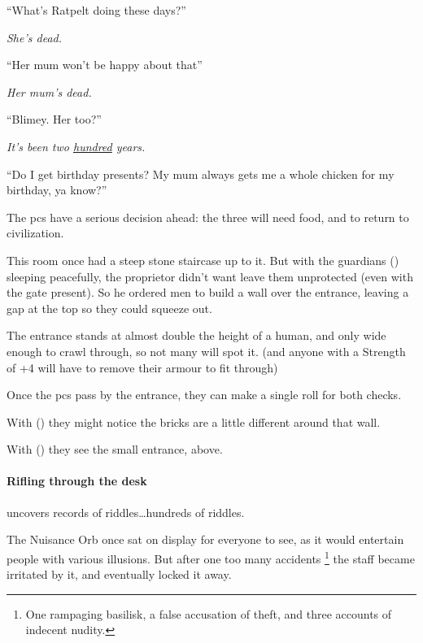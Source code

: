 \begin{speechtext}
  ``What's Ratpelt doing these days?''

  \textit{\raggedleft{} She's dead.}

  ``Her mum won't be happy about that''

  \textit{\raggedleft{} Her mum's dead.}

  ``Blimey. Her too?''

  \textit{\raggedleft{} It's been two \underline{hundred} years.}

  ``Do I get birthday presents?
  My mum always gets me a whole chicken for my birthday, ya know?''
\end{speechtext}

The \glspl{pc} have a serious decision ahead: the three will need food, and to return to civilization.


\begin{exampletext}
  This room once had a steep stone staircase up to it.
  But with the guardians () sleeping peacefully, the proprietor didn't want leave them unprotected (even with the gate present).
  So he ordered men to build a wall over the entrance, leaving a gap at the top so they could squeeze out.
\end{exampletext}

The entrance stands at almost double the height of a human, and only wide enough to crawl through, so not many will spot it.
(and anyone with a Strength of +4 will have to remove their armour to fit through)

Once the \glspl{pc} pass by the entrance, they can make a single roll for both checks.

With  (\tn[14]) they might notice the bricks are a little different around that wall.

With  (\tn[12]) they see the small entrance, above.

\paragraph{Rifling through the desk}
uncovers records of riddles\ldots hundreds of riddles.


\begin{exampletext}
  The Nuisance Orb once sat on display for everyone to see, as it would entertain people with various illusions.
  But after one too many accidents%
  \footnote{One rampaging basilisk, a false accusation of theft, and three accounts of indecent nudity.}
  the staff became irritated by it, and eventually locked it away.
\end{exampletext}

